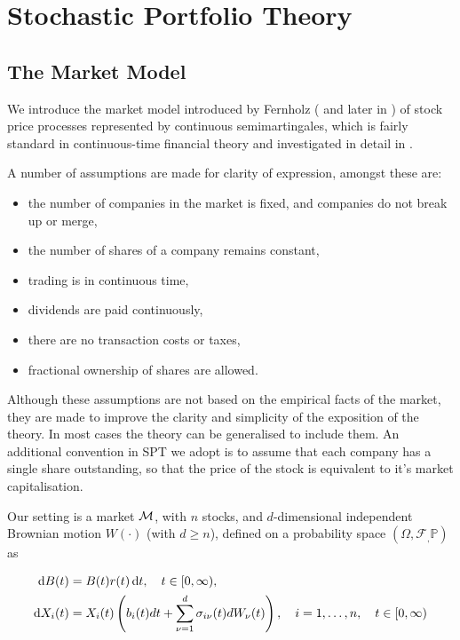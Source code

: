 \documentclass[british]{amsart} \usepackage{lmodern}
\numberwithin{equation}{section} \numberwithin{figure}{section}
\theoremstyle{plain} \newtheorem{thm}{\protect\theoremname}[section]
\theoremstyle{definition} \newtheorem{defn}[thm]{\protect\definitionname}
\theoremstyle{plain} \newtheorem{assumption}[thm]{\protect\assumptionname}
\theoremstyle{plain} \newtheorem{lem}[thm]{\protect\lemmaname}
\theoremstyle{plain} \newtheorem{prop}[thm]{\protect\propositionname}
\theoremstyle{remark} \newtheorem{rem}[thm]{\protect\remarkname}
\theoremstyle{plain} \newtheorem{cor}[thm]{\protect\corollaryname}
\renewcommand{\d}[1]{\mathop{\mathrm{d}{#1}}}
\newcommand{\filtration}[1]{\mathcal{F}_{#1}}
\newcommand{\rangei}{i=1,\dots,n} \newcommand{\measure}{\mathbb{P}}
\newcommand{\probabilityspace}{(\Omega,\filtration,\measure)}
\begin{document}
\section{Stochastic Portfolio Theory}

\subsection{The Market Model}

We introduce the market model introduced by Fernholz (\cite{fernholz1999pgf} and
later in \cite{fernholz2009}) of stock price processes represented by continuous
semimartingales, which is fairly standard in continuous-time financial theory
and investigated in detail in \cite{karatzas1998}.

A number of assumptions are made for clarity of expression, amongst these are:

\begin{itemize}
  \item the number of companies in the market is fixed, and companies do not 
        break up or merge,
  \item the number of shares of a company remains constant,
  \item trading is in continuous time,
  \item dividends are paid continuously,
  \item there are no transaction costs or taxes,
  \item fractional ownership of shares are allowed.
\end{itemize}

Although these assumptions are not based on the empirical facts of the market,
they are made to improve the clarity and simplicity of the exposition of the
theory. In most cases the theory can be generalised to include them. An
additional convention in SPT we adopt is to assume that each company has a
single share outstanding, so that the price of the stock is equivalent to it's
market capitalisation.

Our setting is a market $\mathcal{M}$, with $n$ stocks, and $d$-dimensional
independent Brownian motion $W(\cdot)$ (with $d \ge n$), defined on a
probability space $\probabilityspace$ as

\begin{gather}
  \label{eq:marketmodel}
  \begin{split}
    \d{B(t)} &= B(t)r(t)\d{t},  
      \quad \ranget, \\
    \d{X_{i}(t)} &= 
          X_{i}(t) 
          \left(
              b_{i}(t)dt + \sum_{\nu=1}^{d} \sigma_{i\nu}(t) dW_{\nu}(t)
          \right),
      \quad \rangei,
      \quad \ranget
  \end{split}
\end{gather}
\end{document}
